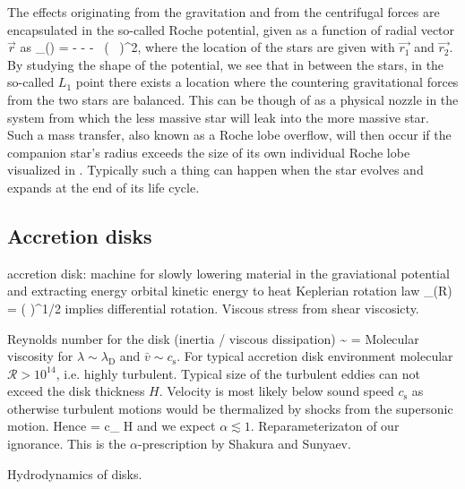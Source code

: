 The effects originating from the gravitation and from the centrifugal forces are encapsulated in the so-called Roche potential, given as a function of radial vector $\vec{r}$ as\cite[see, e.g.,][]{PRP02, LL15}
\be
\Phi_{}() = - - -  ( \vec{ \omega } \times {} )^2,
\ee
where the location of the stars are given with $\vec{r_1}$ and $\vec{r_2}$.
By studying the shape of the potential, we see that in between the stars, in the so-called $L_1$ point there exists a location where the countering gravitational forces from the two stars are balanced.
This can be though of as a physical nozzle in the system from which the less massive star will leak into the more massive star.
Such a mass transfer, also known as a Roche lobe overflow, will then occur if the companion star's radius exceeds the size of its own individual Roche lobe visualized in .
Typically such a thing can happen when the star evolves and expands at the end of its life cycle. 


\subsection{Accretion disks}
accretion disk: machine for slowly lowering material in the graviational potential and extracting energy
orbital kinetic energy to heat
Keplerian rotation law 
\be
\Omega_{}(R) = \left(  \right)^{1/2}
\ee
implies differential rotation.
Viscous stress from shear viscosicty.

Reynolds number for the disk (inertia / viscous dissipation)
\be
{} \sim {} = 
\ee
Molecular viscosity for $\lambda \sim \lambda_{\mathrm{D}}$ and $\bar{v} \sim c_{\mathrm{s}}$.
For typical accretion disk environment molecular $\mathcal{R} > 10^{14}$, i.e. highly turbulent.
Typical size of the turbulent eddies can not exceed the disk thickness $H$.
Velocity is most likely below sound speed $c_{\mathrm{s}}$ as otherwise turbulent motions would be thermalized by shocks from the supersonic motion.
Hence
\be
\nu = \alpha c_{} H
\ee
and we expect $\alpha \lesssim 1$. 
Reparameterizaton of our ignorance.
This is the $\alpha$-prescription by Shakura and Sunyaev.\cite{SS73}

\cite{Cho98}
Hydrodynamics of disks.





